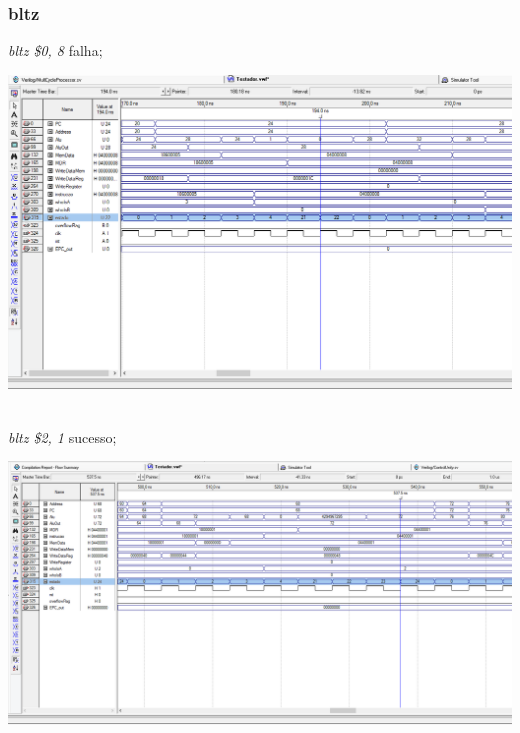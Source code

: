 \documentclass{article}
\begin{document}
    \subsubsection{bltz}
    {\it bltz \$0, 8} falha;\\
    \begin{center}
        \includegraphics[scale=0.25]{bltzfalha.PNG}
    \end{center}
    \\
    \newpage
    {\it bltz \$2, 1} sucesso;\\
    \begin{center}
        \includegraphics[scale=0.25]{bltzsucesso.PNG}
    \end{center}
    
    \\
\end{document}
